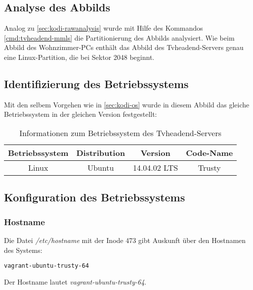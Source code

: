 \subsection{Analyse des Abbilds}

Analog zu \autoref{sec:kodi-rawanalysis} wurde mit Hilfe des Kommandos \autoref{cmd:tvheadend-mmls} die Partitionierung des Abbilds analysiert. Wie beim Abbild des Wohnzimmer-PCs enthält das Abbild des Tvheadend-Servers genau eine Linux-Partition, die bei Sektor 2048 beginnt.

\subsection{Identifizierung des Betriebssystems}
\label{sec:tvheadend-os}

Mit den selbem Vorgehen wie in \autoref{sec:kodi-os} wurde in diesem Abbild das gleiche Betriebssystem in der gleichen Version festgestellt:

\begin{table}[H]
\centering
\begin{tabular}{cccc}
\hline 
Betriebssystem & Distribution & Version & Code-Name \\ 
\hline 
Linux & Ubuntu & 14.04.02 LTS & Trusty \\ 
\hline 
\end{tabular} 
\caption{Informationen zum Betriebssystem des Tvheadend-Servers}
\label{table:tvheadend-os}
\end{table}

\subsection{Konfiguration des Betriebssystems}

\subsubsection{Hostname}
\label{sec:tvheadend-hostname}

Die Datei \textit{/etc/hostname} mit der Inode 473 gibt Auskunft über den Hostnamen des Systems:

\begin{cmd}
\begin{verbatim}
vagrant-ubuntu-trusty-64
\end{verbatim}
\caption{icat -o 2048 tvheadend.raw 473}
\end{cmd}

Der Hostname lautet \textit{vagrant-ubuntu-trusty-64}.

